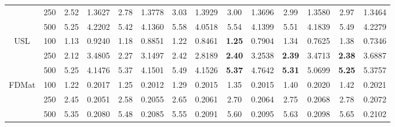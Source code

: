 \documentclass[preprint,12pt]{elsarticle}
\begin{document}
\begin{table}[!t]
{\begin{tabular}{cc|cccccccccccc}
                                       & 250    & 2.52          & 1.3627                    & 2.78          & 1.3778                    & 3.03          & 1.3929                    & 3.00          & 1.3696                    & 2.99          & 1.3580                    & 2.97          & 1.3464          \\
                                       & 500    & 5.25          & 4.2202                    & 5.42          & 4.1360                    & 5.58          & 4.0518                    & 5.54          & 4.1399                    & 5.51          & 4.1839                    & 5.49          & 4.2279          \\ \hline
\multirow{3}{*}{USL}                   & 100    & 1.13          & 0.9240                    & 1.18          & 0.8851                    & 1.22          & 0.8461                    & \textbf{1.25} & 0.7904                    & 1.34          & 0.7625                    & 1.38          & 0.7346          \\
                                       & 250    & 2.12          & 3.4805                    & 2.27          & 3.1497                    & 2.42          & 2.8189                    & \textbf{2.40} & 3.2538                    & \textbf{2.39} & 3.4713                    & \textbf{2.38} & 3.6887          \\
                                       & 500    & 5.25          & 4.1476                    & 5.37          & 4.1501                    & 5.49          & 4.1526                    & \textbf{5.37} & 4.7642                    & \textbf{5.31} & 5.0699                    & \textbf{5.25} & 5.3757          \\ \hline

 \multirow{3}{*}{FDMat}         &  100    &  1.22         &  0.2017                   &  1.25         &  0.2012                 &  1.29          &  0.2015                    &  1.35          &  0.2015                    &  1.40          &  0.2020                    &  1.42          &  0.2021          \\
                                       &  250    &  2.45          &  0.2051                    &  2.58          &  0.2055                    &  2.65          &  0.2061                    &  2.70          &  0.2064                    &  2.75          &  0.2068                    &  2.78          &  0.2072          \\
                                       &  500    &  5.35          &  0.2080                    &  5.48          &  0.2085                    &  5.55          &  0.2091                    &  5.60          &  0.2095                    &  5.63          &  0.2098                    &  5.65          &  0.2102          \\ \hline


\end{tabular}}
\end{table}
\end{document}

